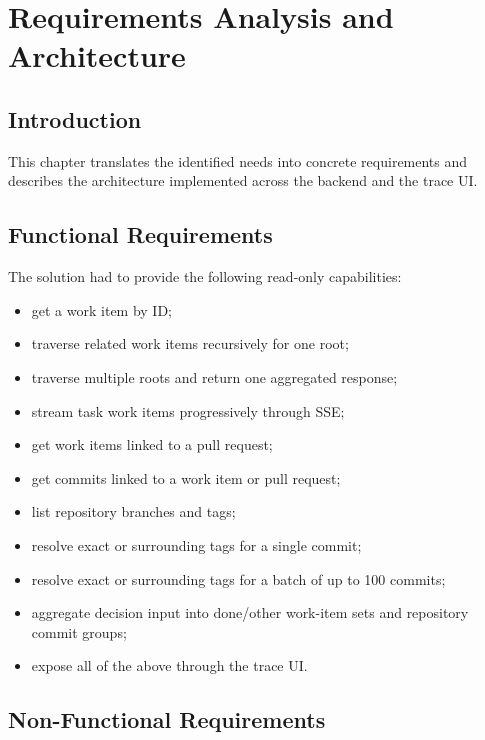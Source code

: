 \documentclass[12pt,a4paper]{report}
\begin{document}
\chapter{Requirements Analysis and Architecture}

\section{Introduction}

This chapter translates the identified needs into concrete requirements and
describes the architecture implemented across the backend and the trace UI.

\section{Functional Requirements}

The solution had to provide the following read-only capabilities:

\begin{itemize}
  \item get a work item by ID;
  \item traverse related work items recursively for one root;
  \item traverse multiple roots and return one aggregated response;
  \item stream task work items progressively through SSE;
  \item get work items linked to a pull request;
  \item get commits linked to a work item or pull request;
  \item list repository branches and tags;
  \item resolve exact or surrounding tags for a single commit;
  \item resolve exact or surrounding tags for a batch of up to 100 commits;
  \item aggregate decision input into done/other work-item sets and repository commit groups;
  \item expose all of the above through the trace UI.
\end{itemize}

\section{Non-Functional Requirements}
\end{document}
